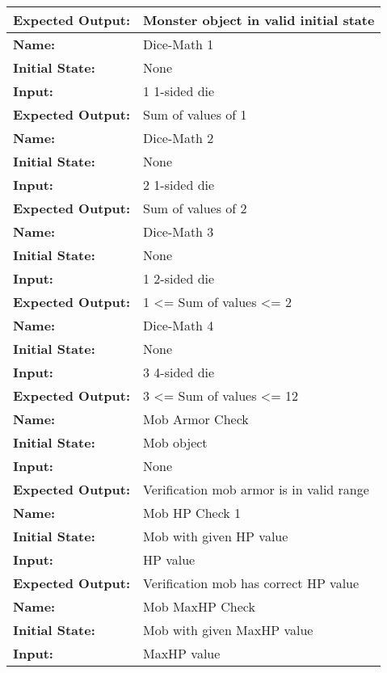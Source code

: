 \documentclass[12pt, titlepage]{article}
\begin{document}
\begin{center}
\begin{longtable}{ l | p{10cm} }
				\textbf{Expected Output:} & Monster object in valid initial state\\[0.6em]
				\hline
				\rule{0pt}{1.5em}\textbf{Name:} & Dice-Math 1\\
				\textbf{Initial State:} & None\\
				\textbf{Input:} & 1 1-sided die\\
				\textbf{Expected Output:} & Sum of values of 1\\[0.6em]
				\hline
				\rule{0pt}{1.5em}\textbf{Name:} & Dice-Math 2\\
				\textbf{Initial State:} & None\\
				\textbf{Input:} & 2 1-sided die\\
				\textbf{Expected Output:} & Sum of values of 2\\[0.6em]
				\hline
				\rule{0pt}{1.5em}\textbf{Name:} & Dice-Math 3\\
				\textbf{Initial State:} & None\\
				\textbf{Input:} & 1 2-sided die\\
				\textbf{Expected Output:} & 1 <= Sum of values <= 2\\[0.6em]
				\hline
				\rule{0pt}{1.5em}\textbf{Name:} & Dice-Math 4\\
				\textbf{Initial State:} & None\\
				\textbf{Input:} & 3 4-sided die\\
				\textbf{Expected Output:} & 3 <= Sum of values <= 12\\[0.6em]
				\hline
				\rule{0pt}{1.5em}\textbf{Name:} & Mob Armor Check\\
				\textbf{Initial State:} & Mob object\\
				\textbf{Input:} & None\\
				\textbf{Expected Output:} & Verification mob armor is in valid range\\[0.6em]
				\hline
				\rule{0pt}{1.5em}\textbf{Name:} & Mob HP Check 1\\
				\textbf{Initial State:} & Mob with given HP value\\
				\textbf{Input:} & HP value\\
				\textbf{Expected Output:} & Verification mob has correct HP value\\[0.6em]
				\hline
				\rule{0pt}{1.5em}\textbf{Name:} & Mob MaxHP Check\\
				\textbf{Initial State:} & Mob with given MaxHP value\\
				\textbf{Input:} & MaxHP value\\

\end{longtable}
\end{center}
\end{document}
